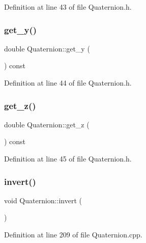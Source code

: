 Definition at line 43 of file Quaternion.\+h.

\mbox{\label{class_quaternion_a9616aee2dd03b502f1fcd98b0a1fd48e}} 
\subsubsection{\texorpdfstring{get\+\_\+y()}{get\_y()}}
{\footnotesize\ttfamily double Quaternion\+::get\+\_\+y (\begin{DoxyParamCaption}{ }\end{DoxyParamCaption}) const\hspace{0.3cm}{\ttfamily [inline]}}



Definition at line 44 of file Quaternion.\+h.

\mbox{\label{class_quaternion_a06bbdf496cde0892c8abaa2c9ccb7303}} 
\subsubsection{\texorpdfstring{get\+\_\+z()}{get\_z()}}
{\footnotesize\ttfamily double Quaternion\+::get\+\_\+z (\begin{DoxyParamCaption}{ }\end{DoxyParamCaption}) const\hspace{0.3cm}{\ttfamily [inline]}}



Definition at line 45 of file Quaternion.\+h.

\mbox{\label{class_quaternion_af412b81da68a27d6e5c259614f8e5fd3}} 
\subsubsection{\texorpdfstring{invert()}{invert()}}
{\footnotesize\ttfamily void Quaternion\+::invert (\begin{DoxyParamCaption}{ }\end{DoxyParamCaption})}



Definition at line 209 of file Quaternion.\+cpp.

